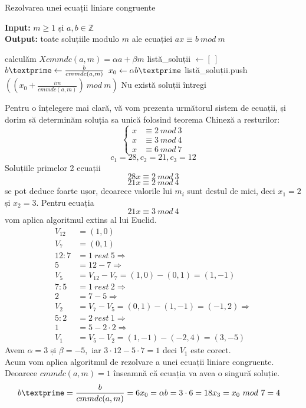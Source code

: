 \documentclass[12pt, oneside]{book}
\begin{document}
		   
		   \begin{algorithm}[H]
		   \caption{Rezolvarea unei ecuații liniare congruente}
		   \textbf{Input:} $ m \geq 1$ și $ a,b \in \mathbb{Z}$  \\
		   \textbf{Output:} toate soluțiile modulo $m$ ale ecuației $ax \equiv b \ mod \ m $
		   \begin{algorithmic}
		   \State calculăm $Xcmmdc(a,m)= \alpha a +  \beta m$
		   \State listă_soluții $ \gets [ \ ] $
		   \State $b \textprime \gets \frac{b}{cmmdc(a,m)} $
		   \State $x_0 \gets \alpha b \textprime $
		   \State listă_soluții.push$\left(     \left( x_0 + \frac{im}{cmmdc(a,m)}    \right) \ mod \ m \right)$
		   \EndFor
		   \Else
		   \State Nu există soluții întregi
		   \EndIf
		   	 
		   \end{algorithmic}
		   \end{algorithm}


		Pentru o înțelegere mai clară, vă vom prezenta următorul sistem de ecuații, și dorim să determinăm soluția sa unică folosind teorema Chineză a resturilor:
\[
\begin{cases}
x &\equiv 2 \ mod \ 3  \\
x &\equiv 3 \ mod \ 4  \\
x &\equiv 6 \ mod \ 7
\end{cases}
\]	  
$$ c_1 = 28 , c_2 = 21, c_3=12 $$
Soluțiile primelor 2 ecuații
$$ 28x \equiv 2 \ mod \ 3 $$
$$ 21x \equiv 2 \ mod \ 4 $$
se pot deduce foarte ușor, deoarece valorile lui $m_i$ sunt destul de mici, deci $x_1=2$ și $x_2=3$. Pentru ecuația
$$ 21x \equiv 3 \ mod \ 4$$
vom aplica algoritmul extins al lui Euclid.
\begin{align*}
V_{12}&=(1,0) \\
V_{7}&=(0,1) \\
12 : 7 &= 1 \ rest \ 5 \Rightarrow \\
5 &= 12 -7 \Rightarrow \\
V_5&= V_{12}-V_7 = (1,0)-(0,1)=(1,-1) \\
7:5 &= 1 \ rest \ 2 \Rightarrow \\
2 &= 7 -5 \Rightarrow \\
V_2&=V_7-V_5 = (0,1)-(1,-1)=(-1,2) \Rightarrow \\
5:2&= 2 \ rest \ 1 \Rightarrow \\
1&=5 - 2 \cdot 2  \Rightarrow \\
V_1&=V_5 - V_2 = (1,-1) - (-2,4) = (3,-5)
\end{align*}
Avem $\alpha =3$ și $\beta=-5,$ iar $ 3 \cdot 12 - 5 \cdot 7 =1$ deci $V_1$ este corect. \\
Acum vom aplica algoritmul de rezolvare a unei ecuații liniare congruente. Deoarece $cmmdc(a,m)=1$ înseamnă că ecuația va avea o singură soluție. 
\begin{align*}
b \textprime &= \frac{b}{cmmdc(a,m)}=6
x_0 = \alpha b = 3 \cdot 6 =18
x_3= x_0 \ mod \ 7 = 4 
\end{align*}
\end{document}
